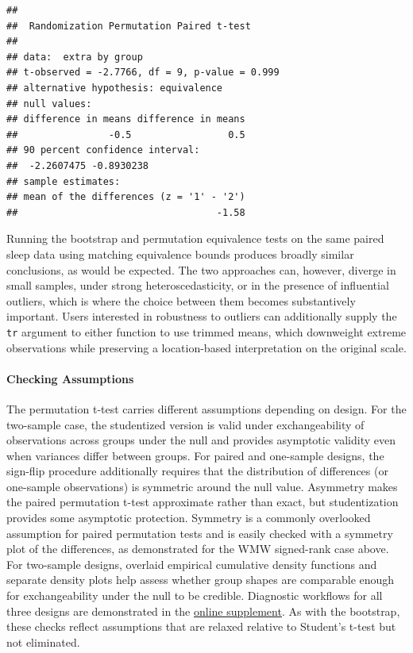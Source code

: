 \documentclass[]{interact}
\theoremstyle{plain}%
\theoremstyle{definition}
\theoremstyle{remark}
\begin{document}
\begin{verbatim}
## 
##  Randomization Permutation Paired t-test
## 
## data:  extra by group
## t-observed = -2.7766, df = 9, p-value = 0.999
## alternative hypothesis: equivalence
## null values:
## difference in means difference in means 
##                -0.5                 0.5 
## 90 percent confidence interval:
##  -2.2607475 -0.8930238
## sample estimates:
## mean of the differences (z = '1' - '2') 
##                                   -1.58
\end{verbatim}

Running the bootstrap and permutation equivalence tests on the same
paired sleep data using matching equivalence bounds produces broadly
similar conclusions, as would be expected. The two approaches can,
however, diverge in small samples, under strong heteroscedasticity, or
in the presence of influential outliers, which is where the choice
between them becomes substantively important. Users interested in
robustness to outliers can additionally supply the \texttt{tr} argument
to either function to use trimmed means, which downweight extreme
observations while preserving a location-based interpretation on the
original scale.

\paragraph{Checking Assumptions}\label{checking-assumptions-6}

The permutation t-test carries different assumptions depending on
design. For the two-sample case, the studentized version is valid under
exchangeability of observations across groups under the null and
provides asymptotic validity even when variances differ between groups.
For paired and one-sample designs, the sign-flip procedure additionally
requires that the distribution of differences (or one-sample
observations) is symmetric around the null value. Asymmetry makes the
paired permutation t-test approximate rather than exact, but
studentization provides some asymptotic protection. Symmetry is a
commonly overlooked assumption for paired permutation tests and is
easily checked with a symmetry plot of the differences, as demonstrated
for the WMW signed-rank case above. For two-sample designs, overlaid
empirical cumulative density functions and separate density plots help
assess whether group shapes are comparable enough for exchangeability
under the null to be credible. Diagnostic workflows for all three
designs are demonstrated in the
\href{https://doi.org/10.5281/zenodo.22776188}{online supplement}. As
with the bootstrap, these checks reflect assumptions that are relaxed
relative to Student's t-test but not eliminated.
\end{document}
